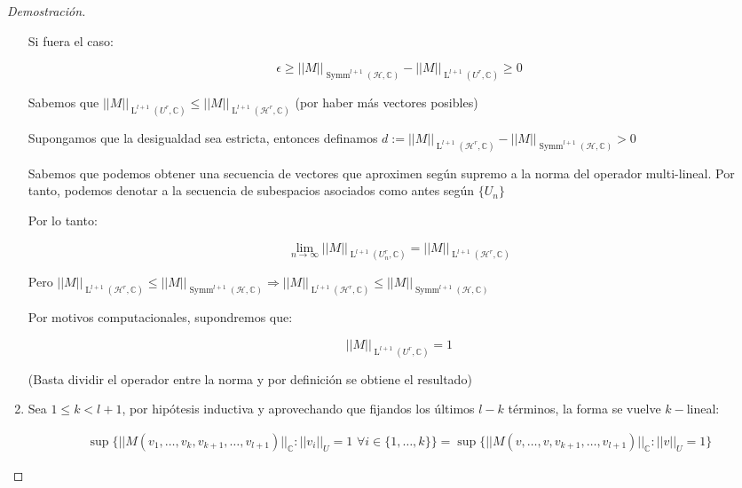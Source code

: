 \begin{proof}[Demostración]
\begin{enumerate}
		Si fuera el caso: 
		
		
		\begin{equation*}
			\epsilon \geq   ||M||_{\operatorname{Symm}^{l+1}(\mathcal{H}, \mathbb{C})}-||M||_{\operatorname{L}^{l+1}(U^r, \mathbb{C})} \geq  0
		\end{equation*}
		
		Sabemos que $||M||_{\operatorname{L}^{l+1}(U^r, \mathbb{C})} \leq ||M||_{\operatorname{L}^{l+1}(\mathcal{H}^r, \mathbb{C})}$ (por haber más vectores posibles)
		
		Supongamos que la desigualdad sea estricta, entonces definamos $d := ||M||_{\operatorname{L}^{l+1}(\mathcal{H}^r, \mathbb{C})} -||M||_{\operatorname{Symm}^{l+1}(\mathcal{H}, \mathbb{C})} > 0$
		
		
		Sabemos que podemos obtener una secuencia de vectores que aproximen según supremo a la norma del operador multi-lineal. Por tanto, podemos denotar a la secuencia de subespacios asociados como antes según $\{U_n\}$ 
		
		Por lo tanto:
		
		\begin{equation*}
			\lim_{n \to \infty} ||M||_{\operatorname{L}^{l+1}(U_n^r, \mathbb{C})} = ||M||_{\operatorname{L}^{l+1}(\mathcal{H}^r, \mathbb{C})}
		\end{equation*}
		
		Pero $||M||_{\operatorname{L}^{l+1}(\mathcal{H}^r, \mathbb{C})} \leq ||M||_{\operatorname{Symm}^{l+1}(\mathcal{H}, \mathbb{C})} \Rightarrow ||M||_{\operatorname{L}^{l+1}(\mathcal{H}^r, \mathbb{C})}\leq ||M||_{\operatorname{Symm}^{l+1}(\mathcal{H}, \mathbb{C})}$
		
		Por motivos computacionales, supondremos que:
		
		\begin{equation*}
			||M||_{\operatorname{L}^{l+1}(U^r, \mathbb{C})} = 1
		\end{equation*}
		
		(Basta dividir el operador entre la norma y por definición se obtiene el resultado) 
		
		
		\item Sea $1\leq k < l+1$, por hipótesis inductiva y aprovechando que fijandos los últimos $l-k$ términos, la forma  se vuelve $k-$lineal:
		
		\begin{align*}
			\sup \{||M(v_1,\dots,v_k,v_{k+1},\dots,v_{l+1})||_\mathbb{C} : ||v_i||_{U} = 1 \, \, \forall i \in \{1,\dots, k\}\}
			= \sup \{||M(v,\dots,v,v_{k+1},\dots,v_{l+1})||_\mathbb{C} : ||v||_{U} = 1\}
		\end{align*}
		

\end{enumerate}
\end{proof}
